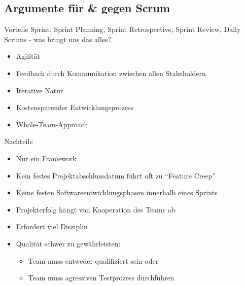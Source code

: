 \documentclass{f4_beamer_metropolis}
\begin{document}
\subsection{Argumente für \& gegen Scrum}

\begin{frame}{Vorteile}
Sprint, Sprint Planning, Sprint Retrospective, Sprint Review, Daily Scrums - was bringt uns das alles?
\begin{itemize}
  \item Agilität
  \item Feedback durch Kommunikation zwischen allen Stakeholdern
  \item Iterative Natur
  \item Kostensparender Entwicklungsprozess
  \item Whole-Team-Approach
\end{itemize}
\end{frame}

\begin{frame}{Nachteile}
  \begin{itemize}
    \item Nur ein Framework
    \item Kein festes Projektabschlussdatum führt oft zu \enquote{Feature Creep}
    \item Keine festen Softwareentwicklungsphasen innerhalb eines Sprints
    \item Projekterfolg hängt von Kooperation des Teams ab
    \item Erfordert viel Disziplin
    \item Qualität schwer zu gewährleisten:
    \begin{itemize}
      \item Team muss entweder qualifiziert sein oder
      \item Team muss agressiven Testprozess durchführen
    \end{itemize}
  \end{itemize}

\end{frame}
\end{document}
